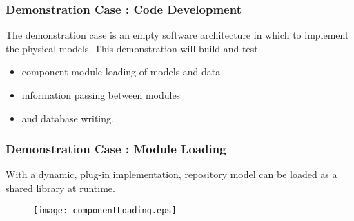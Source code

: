 
\begin{frame}[ctb!]
  \frametitle{Demonstration Case : Code Development}
  The demonstration case is an empty software architecture in which to implement 
  the physical models. This demonstration will build and test
  \begin{itemize}
    \item component module loading of models and data
    \item information passing between modules
    \item and database writing.
  \end{itemize}
\end{frame}

\begin{frame}[ctb!]
  \frametitle{Demonstration Case : Module Loading}
  With a dynamic, plug-in implementation,  
  repository model can be loaded as a shared library at runtime. 

  \begin{figure}[htbp!]
    \begin{center}
      \texttt{[image: componentLoading.eps]}
    \end{center}
  \end{figure}

\end{frame}

